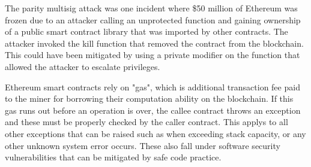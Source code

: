 The parity multisig attack was one incident where \$50 million of Ethereum was frozen due to an attacker calling an unprotected function and gaining ownership of a public smart contract library that was imported by other contracts.
The attacker invoked the kill function that removed the contract from the blockchain.
This could have been mitigated by using a private modifier on the function that allowed the attacker to escalate privileges.

Ethereum smart contracts rely on "gas", which is additional transaction fee paid to the miner for borrowing their computation ability on the blockchain.
If this gas runs out before an operation is over, the callee contract throws an exception and these must be properly checked by the caller contract.
This applys to all other exceptions that can be raised such as when exceeding stack capacity, or any other unknown system error occurs.
These also fall under software security vulnerabilities that can be mitigated by safe code practice.

